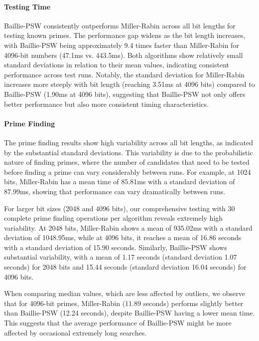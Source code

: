 \paragraph{Testing Time}
Baillie-PSW consistently outperforms Miller-Rabin across all bit lengths for testing known primes. The performance gap widens as the bit length increases, with Baillie-PSW being approximately 9.4 times faster than Miller-Rabin for 4096-bit numbers (47.1ms vs. 443.5ms). Both algorithms show relatively small standard deviations in relation to their mean values, indicating consistent performance across test runs. Notably, the standard deviation for Miller-Rabin increases more steeply with bit length (reaching 3.51ms at 4096 bits) compared to Baillie-PSW (1.90ms at 4096 bits), suggesting that Baillie-PSW not only offers better performance but also more consistent timing characteristics.

\paragraph{Prime Finding}
The prime finding results show high variability across all bit lengths, as indicated by the substantial standard deviations. This variability is due to the probabilistic nature of finding primes, where the number of candidates that need to be tested before finding a prime can vary considerably between runs. For example, at 1024 bits, Miller-Rabin has a mean time of 85.81ms with a standard deviation of 87.99ms, showing that performance can vary dramatically between runs.

For larger bit sizes (2048 and 4096 bits), our comprehensive testing with 30 complete prime finding operations per algorithm reveals extremely high variability. At 2048 bits, Miller-Rabin shows a mean of 935.02ms with a standard deviation of 1048.95ms, while at 4096 bits, it reaches a mean of 16.86 seconds with a standard deviation of 15.90 seconds. Similarly, Baillie-PSW shows substantial variability, with a mean of 1.17 seconds (standard deviation 1.07 seconds) for 2048 bits and 15.44 seconds (standard deviation 16.04 seconds) for 4096 bits.

When comparing median values, which are less affected by outliers, we observe that for 4096-bit primes, Miller-Rabin (11.89 seconds) performs slightly better than Baillie-PSW (12.24 seconds), despite Baillie-PSW having a lower mean time. This suggests that the average performance of Baillie-PSW might be more affected by occasional extremely long searches.

